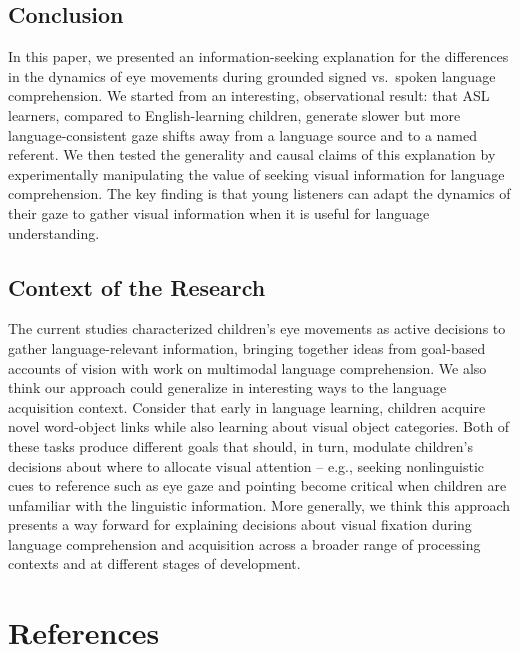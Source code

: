 \documentclass[,man,floatsintext]{apa6}
\begin{document}
\hypertarget{conclusion}{%
\subsection{Conclusion}\label{conclusion}}

In this paper, we presented an information-seeking explanation for the differences in the dynamics of eye movements during grounded signed vs.~spoken language comprehension. We started from an interesting, observational result: that ASL learners, compared to English-learning children, generate slower but more language-consistent gaze shifts away from a language source and to a named referent. We then tested the generality and causal claims of this explanation by experimentally manipulating the value of seeking visual information for language comprehension. The key finding is that young listeners can adapt the dynamics of their gaze to gather visual information when it is useful for language understanding.

\hypertarget{context-of-the-research}{%
\subsection{Context of the Research}\label{context-of-the-research}}

The current studies characterized children's eye movements as active decisions to gather language-relevant information, bringing together ideas from goal-based accounts of vision with work on multimodal language comprehension. We also think our approach could generalize in interesting ways to the language acquisition context. Consider that early in language learning, children acquire novel word-object links while also learning about visual object categories. Both of these tasks produce different goals that should, in turn, modulate children's decisions about where to allocate visual attention -- e.g., seeking nonlinguistic cues to reference such as eye gaze and pointing become critical when children are unfamiliar with the linguistic information. More generally, we think this approach presents a way forward for explaining decisions about visual fixation during language comprehension and acquisition across a broader range of processing contexts and at different stages of development.

\newpage

\hypertarget{references}{%
\section{References}\label{references}}
\end{document}
